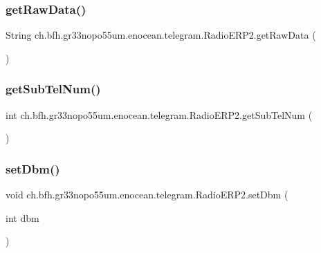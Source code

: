 \subsubsection{\texorpdfstring{get\+Raw\+Data()}{getRawData()}}
{\footnotesize\ttfamily String ch.\+bfh.\+gr33nopo55um.\+enocean.\+telegram.\+Radio\+E\+R\+P2.\+get\+Raw\+Data (\begin{DoxyParamCaption}{ }\end{DoxyParamCaption})}

\hypertarget{classch_1_1bfh_1_1gr33nopo55um_1_1enocean_1_1telegram_1_1_radio_e_r_p2_a56aa366d3a5c468a1821d7f1695865e3}{}\label{classch_1_1bfh_1_1gr33nopo55um_1_1enocean_1_1telegram_1_1_radio_e_r_p2_a56aa366d3a5c468a1821d7f1695865e3} 
\subsubsection{\texorpdfstring{get\+Sub\+Tel\+Num()}{getSubTelNum()}}
{\footnotesize\ttfamily int ch.\+bfh.\+gr33nopo55um.\+enocean.\+telegram.\+Radio\+E\+R\+P2.\+get\+Sub\+Tel\+Num (\begin{DoxyParamCaption}{ }\end{DoxyParamCaption})}

\hypertarget{classch_1_1bfh_1_1gr33nopo55um_1_1enocean_1_1telegram_1_1_radio_e_r_p2_ac854857018cc0635b2377a78856217d6}{}\label{classch_1_1bfh_1_1gr33nopo55um_1_1enocean_1_1telegram_1_1_radio_e_r_p2_ac854857018cc0635b2377a78856217d6} 
\subsubsection{\texorpdfstring{set\+Dbm()}{setDbm()}}
{\footnotesize\ttfamily void ch.\+bfh.\+gr33nopo55um.\+enocean.\+telegram.\+Radio\+E\+R\+P2.\+set\+Dbm (\begin{DoxyParamCaption}\item[{int}]{dbm }\end{DoxyParamCaption})}

